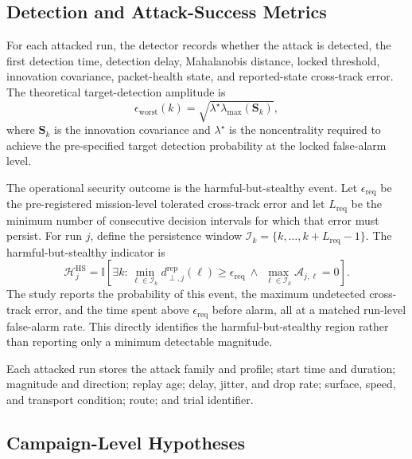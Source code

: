 \documentclass[11pt,a4paper]{article}
\begin{document}
\subsection{Detection and Attack-Success Metrics}

For each attacked run, the detector records whether the attack is detected, the
first detection time, detection delay, Mahalanobis distance, locked threshold,
innovation covariance, packet-health state, and reported-state cross-track
error. The theoretical target-detection amplitude is
\[
\epsilon_{\mathrm{worst}}(k) =
\sqrt{\lambda^\star \lambda_{\max}(\mathbf{S}_k)},
\]
where $\mathbf{S}_k$ is the innovation covariance and $\lambda^\star$ is the
noncentrality required to achieve the pre-specified target detection
probability at the locked false-alarm level.

The operational security outcome is the harmful-but-stealthy event. Let
$\epsilon_{\mathrm{req}}$ be the pre-registered mission-level tolerated
cross-track error and let $L_{\mathrm{req}}$ be the minimum number of
consecutive decision intervals for which that error must persist. For run $j$, define the persistence window
$\mathcal{I}_k=\{k,\ldots,k+L_{\mathrm{req}}-1\}$. The harmful-but-stealthy
indicator is
\begin{equation}
\mathcal{H}^{\mathrm{HS}}_j =
\mathbb{I}\!\left[
\exists k:
\min_{\ell\in\mathcal{I}_k}d^{\mathrm{rep}}_{\perp,j}(\ell)
\geq\epsilon_{\mathrm{req}}
\ \wedge\
\max_{\ell\in\mathcal{I}_k}\mathcal{A}_{j,\ell}=0
\right].
\label{eq:harmful-stealthy}
\end{equation}
The study reports the probability of this event, the maximum undetected
cross-track error, and the time spent above $\epsilon_{\mathrm{req}}$ before
alarm, all at a matched run-level false-alarm rate. This directly identifies
the harmful-but-stealthy region rather than reporting only a minimum detectable
magnitude.

Each attacked run stores the attack family and profile; start time and
duration; magnitude and direction; replay age; delay, jitter, and drop rate;
surface, speed, and transport condition; route; and trial identifier.

\subsection{Campaign-Level Hypotheses}
\end{document}
